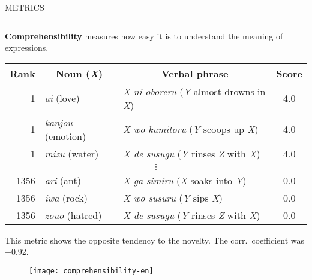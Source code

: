 \documentclass[unicode,20pt]{beamer}
\newcommand\header[1]{\multicolumn{1}{c}{\textbf{#1}}}
\begin{document}
\begin{frame}
\begin{columns}[t]
\begin{column}{.968\textwidth}
\begin{alertblock}{METRICS}
\begin{columns}[t]
\begin{column}{.3\textwidth}
                        \textbf{Comprehensibility}
                        measures how easy it is to understand the meaning of expressions.

                        \begin{table}[!t]
                            \centering\scriptsize
                            \begin{tabular}{rllc}
                                \toprule%
                                \header{Rank} & \header{Noun (\emph{X})} & \header{Verbal phrase} & \header{Score} \\
                                \midrule%
                                1 & \emph{ai} (love)         & \emph{X ni oboreru} (\emph{Y} almost drowns in \emph{X}) & 4.0 \\
                                1 & \emph{kanjou} (emotion)  & \emph{X wo kumitoru} (\emph{Y} scoops up \emph{X})       & 4.0 \\
                                1 & \emph{mizu} (water)      & \emph{X de susugu} (\emph{Y} rinses \emph{Z} with \emph{X})     & 4.0 \\
                                \multicolumn{4}{c}{$\vdots$} \\
                                1356 & \emph{ari} (ant)             & \emph{X ga simiru} (\emph{X} soaks into \emph{Y})    & 0.0 \\
                                1356 & \emph{iwa} (rock)            & \emph{X wo susuru} (\emph{Y} sips \emph{X}) & 0.0 \\
                                1356 & \emph{zouo} (hatred)         & \emph{X de susugu} (\emph{Y} rinses \emph{Z} with \emph{X}) & 0.0 \\
                                \bottomrule%
                            \end{tabular}
                        \end{table}

                        This metric shows the opposite tendency
                        to the novelty.
                        The corr.\ coefficient was −0.92.

                        \begin{figure}
                            \centering
                            \texttt{[image: comprehensibility-en]}
                        \end{figure}

                    \end{column}
                \end{columns}
            \end{alertblock}
        \end{column}
    \end{columns}
    \vspace{11mm}


\end{frame}
\end{document}
